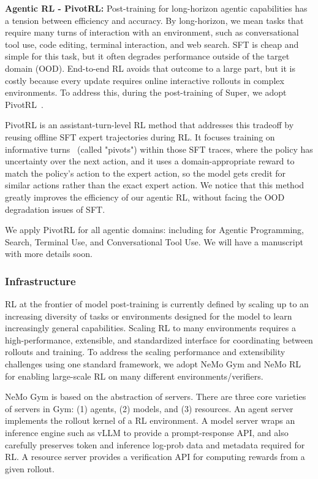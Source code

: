 \textbf{Agentic RL - PivotRL:}
Post-training for long-horizon agentic capabilities has a tension between efficiency and accuracy. By long-horizon, we mean tasks that require many turns of interaction with an environment, such as conversational tool use, code editing, terminal interaction, and web search. SFT is cheap and simple for this task, but it often degrades performance outside of the target domain (OOD). End-to-end RL avoids that outcome to a large part, but it is costly because every update requires online interactive rollouts in complex environments. To address this, during the post-training of Super, we adopt PivotRL~\citep{yi2026pivotrl}. 

PivotRL is an assistant-turn-level RL method that addresses this tradeoff by reusing offline SFT expert trajectories during RL. It focuses training on informative turns  (called "pivots") within those SFT traces, where the policy has uncertainty over the next action, and it uses a domain-appropriate reward to match the policy's action to the expert action, so the model gets credit for similar actions rather than the exact expert action. We notice that this method greatly improves the efficiency of our agentic RL, without facing the OOD degradation issues of SFT.

We apply PivotRL for all agentic domains: including for Agentic Programming, Search, Terminal Use, and Conversational Tool Use. We will have a manuscript with more details soon.

\subsubsection{Infrastructure}
RL at the frontier of model post-training is currently defined by scaling up to an increasing diversity of tasks or environments designed for the model to learn increasingly general capabilities. Scaling RL to many environments requires a high-performance, extensible, and standardized interface for coordinating between rollouts and training. To address the scaling performance and extensibility challenges using one standard framework, we adopt NeMo Gym \citep{nemo-gym} and NeMo RL \citep{nemo-rl} for enabling large-scale RL on many different environments/verifiers.

NeMo Gym is based on the abstraction of servers. There are three core varieties of servers in Gym: (1) agents, (2) models, and (3) resources. An agent server implements the rollout kernel of a RL environment. A model server wraps an inference engine such as vLLM \citep{kwon2023efficientmemorymanagementlarge} to provide a prompt-response API, and also carefully preserves token and inference log-prob data and metadata required for RL. A resource server provides a verification API for computing rewards from a given rollout.

